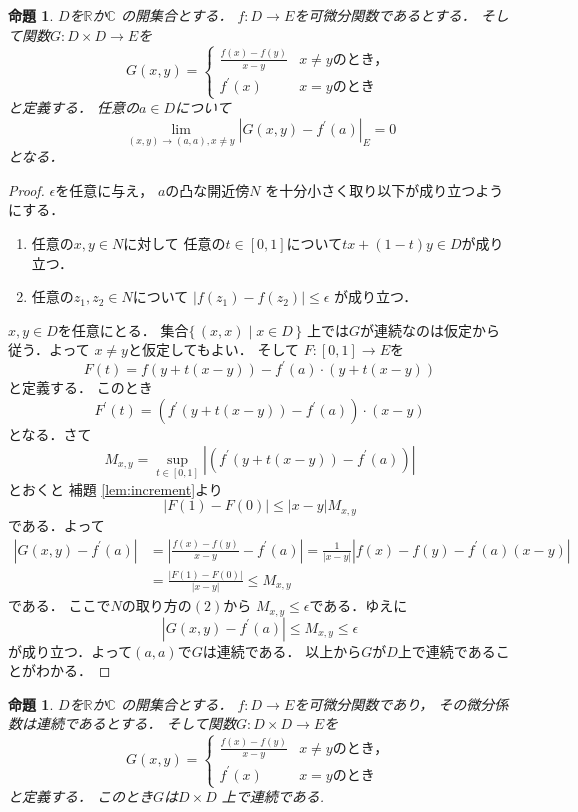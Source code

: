 \documentclass[leqno, a4paper, 12pt]{jsarticle}
\newtheorem{prop}[thm]{命題}
\newcommand{\rr}{\mathbb{R}}
\newcommand{\cc}{\mathbb{C}}
\newcommand{\bibun}[1]{#1^{\prime}}
\begin{document}
\begin{prop}
$D$を$\rr$か$\cc$
の開集合とする．
$f: D\to E$を可微分関数であるとする．
そして関数$G: D\times D\to E$を
\[
G(x, y)=
\begin{cases}
\displaystyle\frac{f(x)-f(y)}{x-y} & \text{$x\neq y$のとき，}\\
 f^{\prime}(x) & \text{$x=y$のとき}
\end{cases}
\]
と定義する．
任意の$a\in D$について\[
\lim_{(x, y)\to (a, a), x\neq y}|G(x, y)-\bibun{f}(a)|_{E}=0
\]
となる．
\end{prop}
\begin{proof}
$\epsilon$を任意に与え，
$a$の凸な開近傍$N$
を十分小さく取り以下が成り立つようにする．
\begin{enumerate}
\item 
任意の$x, y\in N$に対して
任意の$t\in [0, 1]$について$tx+(1-t)y\in D$が成り立つ．
\item 
任意の$z_{1}, z_{2}\in N$について
$|f(z_{1})-f(z_{2})|\le \epsilon$
が成り立つ．
\end{enumerate}
$x, y\in D$を任意にとる．
集合$\{\, (x, x)\mid x\in D\, \}$
上では$G$が連続なのは仮定から従う．よって
$x\neq y$と仮定してもよい．
そして
$F: [0, 1] \to E$を
\[
F(t)=f(y+t(x-y))-\bibun{f}(a)\cdot (y+t(x-y))
\]
と定義する．
このとき
\[
\bibun{F}(t)=(\bibun{f}(y+t(x-y))-\bibun{f}(a))\cdot (x-y)
\]
となる．さて
\[
M_{x, y}=\sup_{t\in [0, 1]}|(\bibun{f}(y+t(x-y))-\bibun{f}(a))|
\]
とおくと
補題 \ref{lem:increment}より
\[
|F(1)-F(0)|\le |x-y|M_{x, y}
\]
である．よって
\begin{align*}
|G(x, y)-\bibun{f}(a)|&=
\left|\frac{f(x)-f(y)}{x-y}-\bibun{f}(a)\right|
=
\frac{1}{|x-y|}
|f(x)-f(y)-\bibun{f}(a)(x-y)|
\\
&=
\frac{|F(1)-F(0)|}{|x-y|}\le 
M_{x, y}
\end{align*}
である．
ここで$N$の取り方の$(2)$から
$M_{x, y}\le \epsilon$である．ゆえに
\[
|G(x, y)-\bibun{f}(a)|\le M_{x,y}\le \epsilon
\]
が成り立つ．よって$(a, a)$で$G$は連続である．
以上から$G$が$D$上で連続であることがわかる．
\end{proof}

\begin{prop}
$D$を$\rr$か$\cc$
の開集合とする．
$f: D\to E$を可微分関数であり，
その微分係数は連続であるとする．
そして関数$G: D\times D\to E$を
\[
G(x, y)=
\begin{cases}
\displaystyle\frac{f(x)-f(y)}{x-y} & \text{$x\neq y$のとき，}\\
 f^{\prime}(x) & \text{$x=y$のとき}
\end{cases}
\]
と定義する．
このとき$G$は$D\times D$
上で連続である.
\end{prop}
\end{document}

